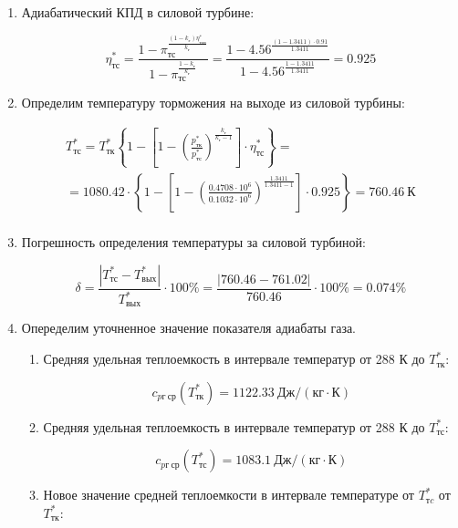 \documentclass[a4paper,10pt]{article}
\begin{document}
\begin{enumerate}
	\item Адиабатический КПД в силовой турбине:
	
	\[
	\eta_{тс}^* = \frac{
					1 - \pi_{тс} ^ 
							{\frac{ (1 - k_г ) \eta_{тсп}^* }{ k_г }}
				}{
					1 - \pi_{тс} ^ 
							{\frac{ 1 - k_г }{ k_г }} 
				} = 
			\frac{
				1 - 4.56 ^ 
						{\frac{ (1 - 1.3411 ) \cdot 0.91 }{ 1.3411 }}
			}{
				1 - 4.56 ^ 
						{\frac{ 1 - 1.3411 }{ 1.3411 }} 
			} = 
		0.925
	\]	
	
	\item Определим температуру торможения на выходе из силовой турбины:
	
	\begin{gather*}
	    T_{тс}^* = T_{тк}^*
		\left\lbrace
			1 -
			\left[
				1 -
					\left(
						\frac{ p_{тк}^* }{ p_{тс}^* }
					\right) ^ \frac{ k_г }{ k_г - 1 }
			\right] \cdot \eta_{тс}^*
		\right\rbrace =\\
	    = 1080.42 \cdot
		\left\lbrace
			1 -
			\left[
				1 -
					\left(
						\frac{ 0.4708 \cdot 10^6 }{ 0.1032 \cdot 10^6 }
					\right) ^ \frac{ 1.3411 }{ 1.3411 - 1 }
			\right] \cdot 0.925
		\right\rbrace =
	760.46\ К\\
	\end{gather*}
	
	\item Погрешность определения температуры за силовой турбиной:
	
	\[
	\delta = \frac{ 
					\left| T_{тс}^* - T_{вых}^* \right|
				}{ 
					T_{вых}^*
				} \cdot 100 \%= 
		\frac{ 
			\left| 760.46 - 761.02 \right|
		}{ 
			760.46
		} \cdot 100 \% =
	0.074 \%
	\]
	
	\item Опеределим уточненное значение показателя адиабаты газа.
	
	\begin{enumerate}
	
		\item Средняя удельная теплоемкость в интервале температур от 288 К до $ T_{тк}^* $:
		
		\[
		c_{pг\ ср} (T_{тк}^*) = 1122.33\ Дж / (кг \cdot К)
		\]
		
		\item Средняя удельная теплоемкость в интервале температур от 288 К до $ T_{тс}^* $:
		
		\[
		c_{pг\ ср} (T_{тс}^*) = 1083.1\ Дж / (кг \cdot К)
		\]
		
		\item Новое значение средней теплоемкости в интервале температуре от $ T_{тc}^* $ от $ T_{тк}^* $:
		

\end{enumerate}
\end{enumerate}
\end{document}
